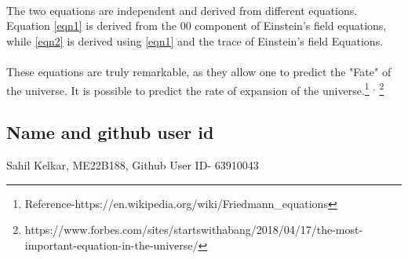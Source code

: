 \paragraph{}
The two equations are independent and derived from different equations.
Equation \ref{eqn1} is derived from the 00 component of Einstein's field equations, while \ref{eqn2} is derived using \ref{eqn1} and the trace of Einstein's field Equations.
\paragraph{}
These equations are truly remarkable, as they allow one to predict the "Fate" of the universe. It is possible to predict the rate of expansion of the universe.\footnote{Reference-https://en.wikipedia.org/wiki/Friedmann\_equations}
$^{,}$
\footnote{https://www.forbes.com/sites/startswithabang/2018/04/17/the-most-important-equation-in-the-universe/}

\subsection{Name and github user id}
Sahil Kelkar, ME22B188, Github User ID- 63910043
%
